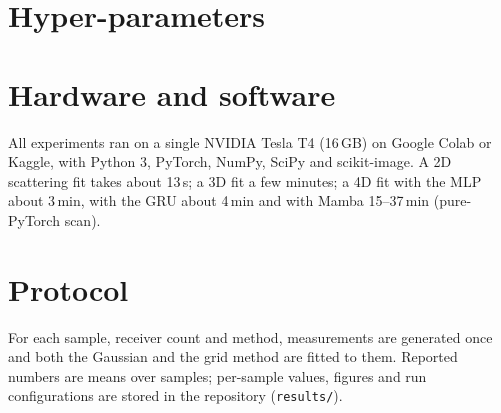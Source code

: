 \section{Hyper-parameters}
\begin{table}[h]
  \centering\small
  \caption{Default settings (overridable from the command line; every run stores its exact settings).}
  \label{tab:hparams}
\end{table}

\section{Hardware and software}
All experiments ran on a single NVIDIA Tesla T4 (16\,GB) on Google Colab or Kaggle, with Python 3, PyTorch, NumPy,
SciPy and scikit-image. A 2D scattering fit takes about 13\,s; a 3D fit a few minutes; a 4D fit with the MLP about
3\,min, with the GRU about 4\,min and with Mamba 15--37\,min (pure-PyTorch scan).

\section{Protocol}
For each sample, receiver count and method, measurements are generated once and both the Gaussian and the grid
method are fitted to them. Reported numbers are means over samples; per-sample values, figures and run
configurations are stored in the repository (\texttt{results/}).
